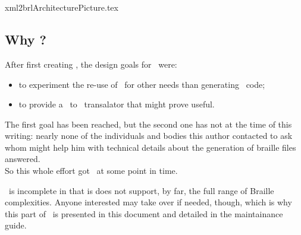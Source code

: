 



\chapter{\xmlToBrl\ }

{xml2brlArchitecturePicture.tex}


\section{Why \xmlToBrl?}

After first creating \xmlToLy, the design goals for \xmlToBrl\ were:
\begin{itemize}
\item to experiment the re-use of \msrRepr\ for other needs than generating \lily\ code;
\item to provide a \mxml\ to \braille\ transalator that might prove useful.
\end{itemize}

The first goal has been reached, but the second one has not at the time of this writing: nearly none of the individuals and bodies this author contacted to ask whom might help him with technical details about the generation of braille files answered.\\
So this whole effort got \frozen\ at some point in time.

\xmlToBrl\ is incomplete in that is does not support, by far, the full range of Braille complexities. Anyone interested may take over if needed, though, which is why this part of \mf\ is presented in this document and detailed in the maintainance guide.


